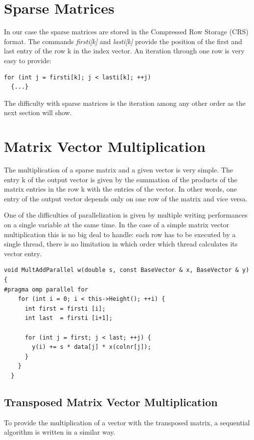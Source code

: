 \documentclass[a4paper,11pt]{scrartcl}
\begin{document}
\section{Sparse Matrices}
In our case the sparse matrices are stored in the Compressed Row Storage (CRS)
format. The commands {\em firsti[k]}\/ and {\em lasti[k]}\/ provide the
position of the first and last entry of the row k in the index vector.
An iteration through one row is very easy to provide:

\begin{lstlisting}
for (int j = firsti[k]; j < lasti[k]; ++j)
  {...}
\end{lstlisting}

The difficulty with sparse matrices is the iteration among any other order as
the next section will show.

\section{Matrix Vector Multiplication}
The multiplication of a sparse matrix and a given vector is very simple.
The entry k of the output vector is given by the summation of the products
of the matrix entries in the row k with the entries of the vector. In other
words, one entry of the output vector depends only on one row of the matrix
and vice versa.

One of the difficulties of parallelization is given by multiple writing
performances on a single variable at the same time. In the case of a simple
matrix vector multiplication this is no big deal to handle: each row has to be
executed by a single thread, there is no limitation in which order which thread
calculates its vector entry.

\begin{lstlisting}
void MultAddParallel w(double s, const BaseVector & x, BaseVector & y)
{
#pragma omp parallel for
    for (int i = 0; i < this->Height(); ++i) {
      int first = firsti [i];
      int last  = firsti [i+1];

      for (int j = first; j < last; ++j) {
        y(i) += s * data[j] * x(colnr[j]);
      }
    }
  }

\end{lstlisting}

\subsection{Transposed Matrix Vector Multiplication}\label{section:trans}
To provide the multiplication of a vector with the transposed matrix, a
sequential algorithm is written in a similar way.
\end{document}
